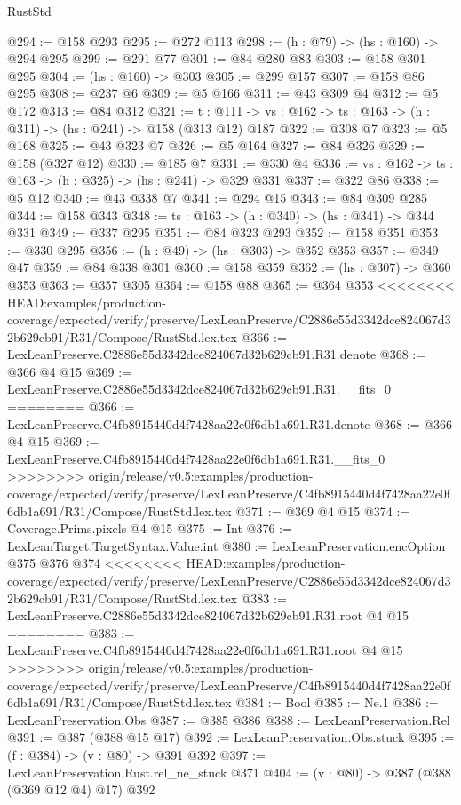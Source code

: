 \begin{lexlean}{RustStd}
\begin{coremodule}
{\begin{coremodule}
@294 := @158 @293
@295 := @272 @113
@298 := (h : @79) -> (hs : @160) -> @294 @295
@299 := @291 @77
@301 := @84 @280 @83
@303 := @158 @301 @295
@304 := (hs : @160) -> @303
@305 := @299 @157
@307 := @158 @86 @295
@308 := @237 @6
@309 := @5 @166
@311 := @43 @309 @4
@312 := @5 @172
@313 := @84 @312
@321 := {t : @111} ->
  {vs : @162} -> {ts : @163} -> (h : @311) -> (hs : @241) -> @158 (@313 @12) @187
@322 := @308 @7
@323 := @5 @168
@325 := @43 @323 @7
@326 := @5 @164
@327 := @84 @326
@329 := @158 (@327 @12)
@330 := @185 @7
@331 := @330 @4
@336 := {vs : @162} -> {ts : @163} -> (h : @325) -> (hs : @241) -> @329 @331
@337 := @322 @86
@338 := @5 @12
@340 := @43 @338 @7
@341 := @294 @15
@343 := @84 @309 @285
@344 := @158 @343
@348 := {ts : @163} -> (h : @340) -> (hs : @341) -> @344 @331
@349 := @337 @295
@351 := @84 @323 @293
@352 := @158 @351
@353 := @330 @295
@356 := (h : @49) -> (hs : @303) -> @352 @353
@357 := @349 @47
@359 := @84 @338 @301
@360 := @158 @359
@362 := (hs : @307) -> @360 @353
@363 := @357 @305
@364 := @158 @88
@365 := @364 @353
<<<<<<<< HEAD:examples/production-coverage/expected/verify/preserve/LexLeanPreserve/C2886e55d3342dce824067d32b629cb91/R31/Compose/RustStd.lex.tex
@366 := LexLeanPreserve.C2886e55d3342dce824067d32b629cb91.R31.denote
@368 := @366 @4 @15
@369 := LexLeanPreserve.C2886e55d3342dce824067d32b629cb91.R31.__fits_0
========
@366 := LexLeanPreserve.C4fb8915440d4f7428aa22e0f6db1a691.R31.denote
@368 := @366 @4 @15
@369 := LexLeanPreserve.C4fb8915440d4f7428aa22e0f6db1a691.R31.__fits_0
>>>>>>>> origin/release/v0.5:examples/production-coverage/expected/verify/preserve/LexLeanPreserve/C4fb8915440d4f7428aa22e0f6db1a691/R31/Compose/RustStd.lex.tex
@371 := @369 @4 @15
@374 := Coverage.Prims.pixels @4 @15
@375 := Int
@376 := LexLeanTarget.TargetSyntax.Value.int
@380 := LexLeanPreservation.encOption @375 @376 @374
<<<<<<<< HEAD:examples/production-coverage/expected/verify/preserve/LexLeanPreserve/C2886e55d3342dce824067d32b629cb91/R31/Compose/RustStd.lex.tex
@383 := LexLeanPreserve.C2886e55d3342dce824067d32b629cb91.R31.root @4 @15
========
@383 := LexLeanPreserve.C4fb8915440d4f7428aa22e0f6db1a691.R31.root @4 @15
>>>>>>>> origin/release/v0.5:examples/production-coverage/expected/verify/preserve/LexLeanPreserve/C4fb8915440d4f7428aa22e0f6db1a691/R31/Compose/RustStd.lex.tex
@384 := Bool
@385 := Ne.{1}
@386 := LexLeanPreservation.Obs
@387 := @385 @386
@388 := LexLeanPreservation.Rel
@391 := @387 (@388 @15 @17)
@392 := LexLeanPreservation.Obs.stuck
@395 := (f : @384) -> (v : @80) -> @391 @392
@397 := LexLeanPreservation.Rust.rel_ne_stuck @371
@404 := (v : @80) -> @387 (@388 (@369 @12 @4) @17) @392

\end{coremodule}}
\end{coremodule}
\end{lexlean}
